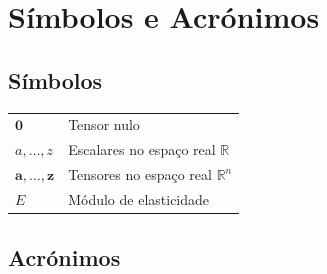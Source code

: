 %

%

\chapter*{Símbolos e Acrónimos}

\section*{Símbolos}

\begin{longtable}{@{}p{3cm}l@{}}
    $\mathbf{0}$          & Tensor nulo \\[0.3cm]
    $a, \ldots, z$        & Escalares no espaço real $\mathbb{R}$ \\[0.3cm]
    $\mathbf{a}, \ldots, \mathbf{z}$ & Tensores no espaço real $\mathbb{R}^n$ \\[0.3cm]
    $E$                   & Módulo de elasticidade \\
\end{longtable}

\vspace{0.5cm}

\section*{Acrónimos}

